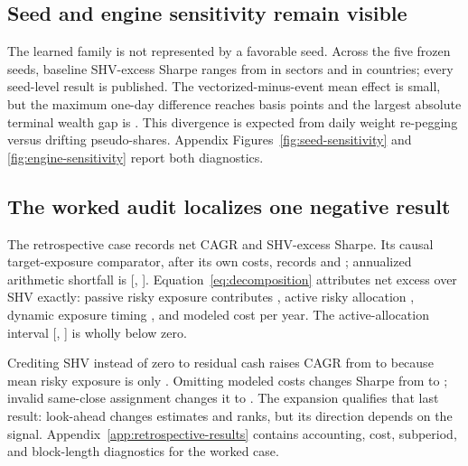 \documentclass{article}
\begin{document}
\subsection{Seed and engine sensitivity remain visible}

The learned family is not represented by a favorable seed. Across the five
frozen seeds, baseline SHV-excess Sharpe ranges from
\ExpansionSectorSeedRange{} in sectors and \ExpansionCountrySeedRange{} in
countries; every seed-level result is published. The vectorized-minus-event
mean effect is small, but the maximum one-day difference reaches
\ExpansionEngineMaxDailyBp{} basis points and the largest absolute terminal
wealth gap is \ExpansionEngineMaxWealthGap{}. This divergence is expected from
daily weight re-pegging versus drifting pseudo-shares. Appendix
Figures~\ref{fig:seed-sensitivity} and \ref{fig:engine-sensitivity} report both
diagnostics.

\subsection{The worked audit localizes one negative result}

The retrospective case records \PaperNetCAGR{} net CAGR and
\PaperNetSharpe{} SHV-excess Sharpe. Its causal target-exposure comparator,
after its own costs, records \PaperCostedComparatorCAGR{} and
\PaperCostedComparatorSharpe{}; annualized arithmetic shortfall is
\PaperCostedActiveMean{} [\PaperCostedActiveLower{},
\PaperCostedActiveUpper{}]. Equation~\ref{eq:decomposition} attributes net
excess over SHV exactly: passive risky exposure contributes
\PaperPassiveExposureMean{}, active risky allocation \PaperAllocationMean{},
dynamic exposure timing \PaperTimingMean{}, and modeled cost
\PaperImplementationCostMean{} per year. The active-allocation interval
[\PaperAllocationLower{}, \PaperAllocationUpper{}] is wholly below zero.

Crediting SHV instead of zero to residual cash raises CAGR from
\PaperZeroCashCAGR{} to \PaperNetCAGR{} because mean risky exposure is only
\PaperMeanExposure{}. Omitting modeled costs changes Sharpe from
\PaperNetSharpe{} to \PaperZeroCostSharpe{}; invalid same-close assignment
changes it to \PaperSameCloseSharpe{}. The expansion qualifies that last result:
look-ahead changes estimates and ranks, but its direction depends on the signal.
Appendix~\ref{app:retrospective-results} contains accounting, cost, subperiod,
and block-length diagnostics for the worked case.
\end{document}
